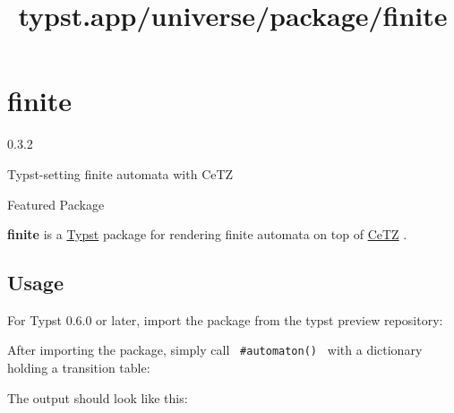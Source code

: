 \title{typst.app/universe/package/finite}

\label{banner}
\section{finite}\label{finite}

{ 0.3.2 }

Typst-setting finite automata with CeTZ

{ } Featured Package

\label{readme}
\textbf{finite} is a \href{https://github.com/typst/typst}{Typst}
package for rendering finite automata on top of
\href{https://github.com/johannes-wolf/typst-canvas}{CeTZ} .

\subsection{Usage}\label{usage}

For Typst 0.6.0 or later, import the package from the typst preview
repository:

\begin{Shaded}
\begin{Highlighting}[]
\OperatorTok{:}
\end{Highlighting}
\end{Shaded}

After importing the package, simply call \texttt{\ \#automaton()\ } with
a dictionary holding a transition table:

\begin{Shaded}
\begin{Highlighting}[]
\OperatorTok{:}

\NormalTok{\#}\NormalTok{((}
\OperatorTok{:}\OperatorTok{:}\OperatorTok{,}\OperatorTok{:}\NormalTok{)}\OperatorTok{,}
\OperatorTok{:}\OperatorTok{:}\NormalTok{(}\OperatorTok{,}\NormalTok{)}\OperatorTok{,}\OperatorTok{:}\NormalTok{)}\OperatorTok{,}
\OperatorTok{:}\NormalTok{ ()}\OperatorTok{,}
\NormalTok{))}
\end{Highlighting}
\end{Shaded}

The output should look like this:

